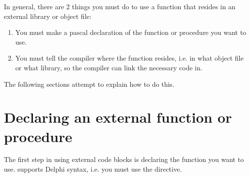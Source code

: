 \documentclass{report}
\begin{document}
In general, there are 2 things you must do to use a function that resides in
an external library or object file:
\begin{enumerate}
\item You must make a pascal declaration of the function or procedure you
want to use.
\item You must tell the compiler where the function resides, i.e. in what
object file or what library, so the compiler can link the necessary code in.
\end{enumerate}
The following sections attempt to explain how to do this.

\section{Declaring an external function or procedure}
\label{se:ExternalDeclaration}

The first step in using external code blocks is declaring the function you
want to use. \fpc supports Delphi syntax, i.e. you must use the
 directive.
\end{document}

